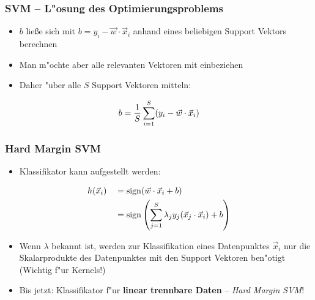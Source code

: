 
\begin{frame}

\frametitle{SVM -- L"osung des Optimierungsproblems}

\begin{itemize}
	\setlength{\itemsep}{15pt}
	\item $b$ lie{\ss}e sich mit $b = y_i - \vec{w} \cdot \vec{x}_i$ anhand eines beliebigen Support Vektors berechnen
	\item Man m"ochte aber alle relevanten Vektoren mit einbeziehen
	\item Daher "uber alle $S$ Support Vektoren mitteln:
\end{itemize}

\begin{equation}
	b = \frac{1}{S} \sum\limits_{i=1}^S (y_i - \vec{w}\cdot \vec{x}_i) \notag
\end{equation}

\end{frame}






\begin{frame}

\frametitle{Hard Margin SVM}

\begin{itemize}
	\item Klassifikator kann aufgestellt werden:
\end{itemize}

\begin{equation}
	\begin{aligned}
		& h(\vec{x}_i) && = \mathrm{sign}(\vec{w}\cdot\vec{x}_i+b) \notag \\	
		& 	           && = \mathrm{sign}\left(\sum\limits_{j=1}^S \lambda_j y_j (\vec{x}_j\cdot\vec{x}_i)+b \right)	
	\end{aligned}	
\end{equation}

\begin{itemize}
	\setlength{\itemsep}{15pt}
	\item Wenn $\lambda$ bekannt ist, werden zur Klassifikation eines Datenpunktes $\vec{x}_i$ nur die Skalarprodukte des Datenpunktes mit den Support Vektoren ben"otigt (Wichtig f"ur Kernels!)
	\item Bis jetzt: Klassifikator f"ur \textbf{linear trennbare Daten} -- \emph{Hard Margin SVM}!
\end{itemize}

\end{frame}





